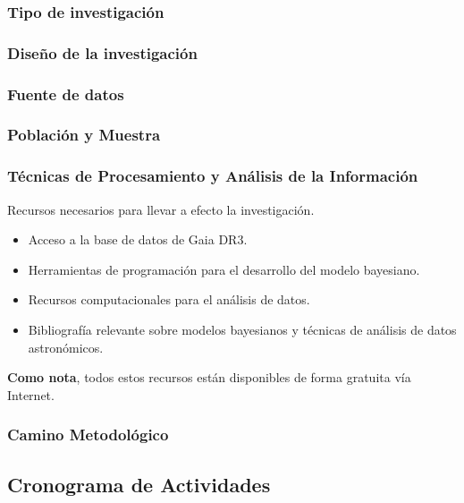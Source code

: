 \documentclass[stu, 12pt, letterpaper, donotrepeattitle, floatsintext, natbib]{apa7}
\begin{document}
\subsubsection{Tipo de investigación}
\subsubsection{Diseño de la investigación}
\subsubsection{Fuente de datos}
\subsubsection{Población y Muestra}
\subsubsection{Técnicas de Procesamiento y Análisis de la Información}

Recursos necesarios para llevar a efecto la investigación.

\begin{itemize}
    \item Acceso a la base de datos de Gaia DR3.
    \item Herramientas de programación para el desarrollo del modelo bayesiano.
    \item Recursos computacionales para el análisis de datos.
    \item Bibliografía relevante sobre modelos bayesianos y técnicas de análisis de datos astronómicos.    
\end{itemize}

\textbf{Como nota}, todos estos recursos están disponibles de forma gratuita vía Internet.

\subsubsection{Camino Metodológico}
\subsection{Cronograma de Actividades}

\newpage
\renewcommand\refname{\large\textbf{Referencias Bibliográficas}}

\end{document}
